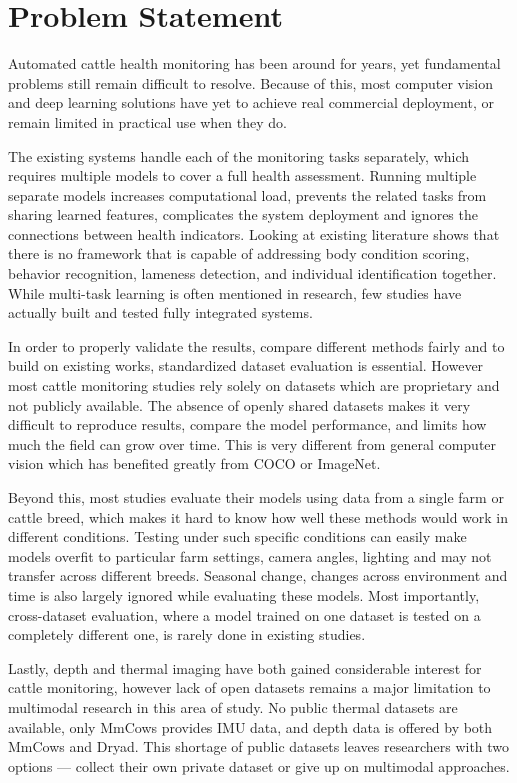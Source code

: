 \section{Problem Statement}

Automated cattle health monitoring has been around for years, yet fundamental problems still remain difficult to resolve. Because of this, most computer vision and deep learning solutions have yet to achieve real commercial deployment, or remain limited in practical use when they do.

The existing systems handle each of the monitoring tasks separately, which requires multiple models to cover a full health assessment. Running multiple separate models increases computational load, prevents the related tasks from sharing learned features, complicates the system deployment and ignores the connections between health indicators. Looking at existing literature shows that there is no framework that is capable of addressing body condition scoring, behavior recognition, lameness detection, and individual identification together. While multi-task learning is often mentioned in research, few studies have actually built and tested fully integrated systems.

In order to properly validate the results, compare different methods fairly and to build on existing works, standardized dataset evaluation is essential. However most cattle monitoring studies rely solely on datasets which are proprietary and not publicly available. The absence of openly shared datasets makes it very difficult to reproduce results, compare the model performance, and limits how much the field can grow over time. This is very different from general computer vision which has benefited greatly from COCO or ImageNet.

Beyond this, most studies evaluate their models using data from a single farm or cattle breed, which makes it hard to know how well these methods would work in different conditions. Testing under such specific conditions can easily make models overfit to particular farm settings, camera angles, lighting and may not transfer across different breeds. Seasonal change, changes across environment and time is also largely ignored while evaluating these models. Most importantly, cross-dataset evaluation, where a model trained on one dataset is tested on a completely different one, is rarely done in existing studies.

Lastly, depth and thermal imaging have both gained considerable interest for cattle monitoring, however lack of open datasets remains a major limitation to multimodal research in this area of study. No public thermal datasets are available, only MmCows provides IMU data, and depth data is offered by both MmCows and Dryad. This shortage of public datasets leaves researchers with two options --- collect their own private dataset or give up on multimodal approaches.


